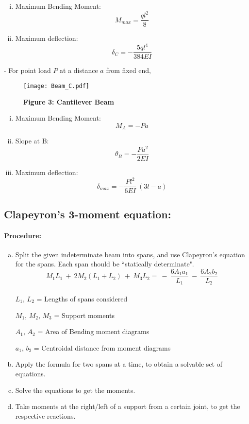 \documentclass{article}
\begin{document}
{\begin{figure}
\end{figure}
\begin{enumerate}[(i)]
\item Maximum Bending Moment: {\LARGE $$M_{max}=\frac{ql^2}{8}$$}
\item Maximum deflection:
{\LARGE $$\delta_C=-\frac{5ql^4}{384EI}{}$$}
\end{enumerate}
-\newpage
{\LARGE For point load $P$ at a distance $a$ from fixed end,}
\begin{figure}
\caption*{\Large \textbf{Figure 3: Cantilever Beam}}
\hbox{\hspace{-2.2cm}\texttt{[image: Beam\_C.pdf]}}
\end{figure}
\begin{enumerate}[(i)]
\item Maximum Bending Moment: {\LARGE $$M_A=-Pa$$}
\item Slope at B: {\LARGE $$\theta_B=-\frac{Pa^2}{2EI}$$}
\item Maximum deflection:
{\LARGE $$\delta_{max}=-\frac{Pl^2}{6EI}\ (3l-a)$$}
\end{enumerate}
\newpage
\subsection{\LARGE Clapeyron's 3-moment equation:}
\paragraph{\Large Procedure:}
\begin{enumerate}[(a)]
\item Split the given indeterminate beam into spans, and use Clapeyron's equation for the spans. Each span should be ``statically determinate".
{\LARGE $$M_1L_1\ +\ 2M_2(L_1+L_2)\ +\ M_3L_2=\ -\ \frac{6A_1a_1}{L_1}\ -\ \frac{6A_2b_2}{L_2}$$}
\\
{\LARGE $L_1$, $L_2$} = Lengths of spans considered

{\LARGE $M_1$, $M_2$, $M_3$} = Support moments

{\LARGE $A_1$, $A_2$} = Area of Bending moment diagrams

{\LARGE $a_1$, $b_2$} = Centroidal distance from moment diagrams
\\
\item Apply the formula for two spans at a time, to obtain a solvable set of equations.
\item Solve the equations to get the moments.
\item Take moments at the right/left of a support from a certain joint, to get the respective reactions.
\end{enumerate}
}
\end{document}
